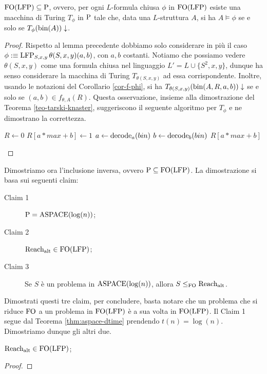 \begin{proposizione}
 $\FO(\LFP) \subseteq \P$, ovvero, per ogni $L$-formula chiusa $\phi$ in $\FO(\LFP)$ esiste
 una macchina di Turing $T_\phi$ in $\P$ tale che, data una $L$-struttura $A$,
 si ha $A \models \phi$ se e solo se $T_\phi(\bin(A))\downarrow$.
\end{proposizione}
\begin{proof}
  Rispetto al lemma precedente dobbiamo solo considerare in più il caso
  $\phi :\equiv \LFP_{S,x,y}\theta(S,x,y)(a,b)$, con $a, b$ costanti.
  Notiamo che possiamo vedere
  $\theta(S,x,y)$ come una formula chiusa nel linguaggio $L'=L \cup \{S^2,x,y\}$,
  dunque ha senso considerare la macchina di Turing $T_{\theta(S,x,y)}$ ad essa
  corrispondente. Inoltre, usando le notazioni del Corollario \ref{cor-f-phi},
  si ha $T_{\theta(S,x,y)}(\bin(A,R,a,b))\downarrow$
  se e solo se $(a,b) \in f_{\theta,A}(R)$. Questa osservazione, insieme alla
  dimostrazione del Teorema \ref{teo-tarski-knaster}, suggeriscono il seguente
  algoritmo per $T_\phi$ e ne dimostrano la correttezza.
  
  \begin{algorithmic}
    \State $R\gets 0$
	\State $R[a*max + b] \gets 1$
      \EndIf
      \EndFor
    \EndFor
    \State $a \gets \decode_a (bin)$
    \State $b \gets \decode_b (bin)$
    \State \Return $R[a*max + b]$
  \EndFunction
  \end{algorithmic}
\end{proof}

Dimostriamo ora l'inclusione inversa, ovvero $\P \subseteq \FO(\LFP)$. La
dimostrazione si basa sui seguenti claim:
\begin{description}
 \item[Claim 1]\label{p_eq_a} $\P = \ASPACE(\log(n))$;
 \item[Claim 2]\label{ralt_in_p} $\Ralt \in \FO(\LFP)$;
 \item[Claim 3]\label{reduct_fo} Se $S$ è un problema in $\ASPACE(\log(n))$, allora $S \leq_{\FO} \Ralt$.
\end{description}
Dimostrati questi tre claim, per concludere, basta notare che un problema che si
riduce $\FO$ a un problema in $\FO(\LFP)$ è a sua volta in $\FO(\LFP)$.
Il Claim 1 segue dal Teorema \ref{thm:aspace-dtime} prendendo $t(n) = \log(n)$.
Dimostriamo dunque gli altri due.
\begin{proposizione}
\label{prop:ralt-in-fo(lfp)}
  $\Ralt \in \FO(\LFP)$;
\end{proposizione}
\begin{proof}
\end{proof}

